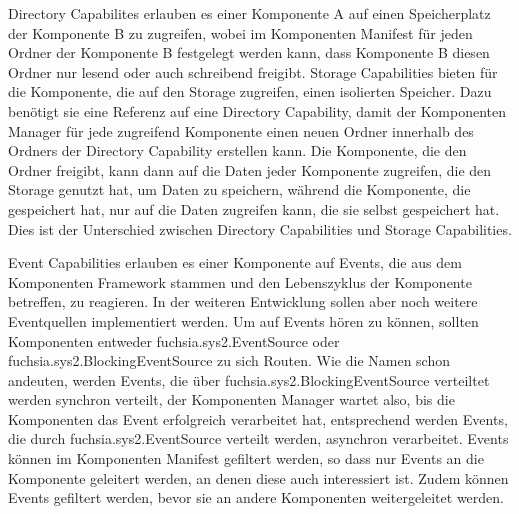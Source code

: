 \documentclass[a4paper]{scrartcl}
\begin{document}
Directory Capabilites erlauben es einer Komponente A auf einen Speicherplatz der Komponente B zu zugreifen, wobei im Komponenten Manifest für jeden Ordner der Komponente B festgelegt werden kann, dass Komponente B diesen Ordner nur lesend oder auch schreibend freigibt. Storage Capabilities bieten für die Komponente, die auf den Storage zugreifen, einen isolierten Speicher. Dazu benötigt sie eine Referenz auf eine Directory Capability, damit der Komponenten Manager für jede zugreifend Komponente einen neuen Ordner innerhalb des Ordners der Directory Capability erstellen kann. Die Komponente, die den Ordner freigibt, kann dann auf die Daten jeder Komponente zugreifen, die den Storage genutzt hat, um Daten zu speichern, während die Komponente, die gespeichert hat, nur auf die Daten zugreifen kann, die sie selbst gespeichert hat. Dies ist der Unterschied zwischen Directory Capabilities und Storage Capabilities.

Event Capabilities erlauben es einer Komponente auf Events, die aus dem Komponenten Framework stammen und den Lebenszyklus der Komponente betreffen, zu reagieren. In der weiteren Entwicklung sollen aber noch weitere Eventquellen implementiert werden.  Um auf Events hören zu können, sollten Komponenten entweder fuchsia.sys2.EventSource oder fuchsia.sys2.BlockingEventSource zu sich Routen. Wie die Namen schon andeuten, werden Events, die über fuchsia.sys2.BlockingEventSource verteiltet werden synchron verteilt, der Komponenten Manager wartet also, bis die Komponenten das Event erfolgreich verarbeitet hat, entsprechend werden Events, die durch fuchsia.sys2.EventSource verteilt werden, asynchron verarbeitet. Events können im Komponenten Manifest gefiltert werden, so dass nur Events an die Komponente geleitert werden, an denen diese auch interessiert ist. Zudem können Events gefiltert werden, bevor sie an andere Komponenten weitergeleitet werden. \cite{Fuchsia.Component.Events}
\end{document}
